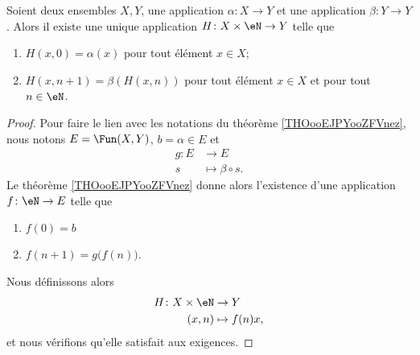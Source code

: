  
\begin{corollary}       \label{CORooVNHKooRkKtXf}
    Soient deux ensembles \( X,Y\), une application \( \alpha\colon X\to Y\) et une application \( \beta\colon Y\to Y\). Alors il existe une unique application \( H\colon X\times \eN\to Y\) telle que
\begin{enumerate}
    \item
  $H(x , 0) = \alpha(x)$   pour tout élément $x\in X$;
  \item
 $H(x , n+1 ) = \beta( H( x , n) )$ pour tout élément \( x\in X\) et pour tout \( n\in \eN\).
\end{enumerate}
\end{corollary}

\begin{proof}
    Pour faire le lien avec les notations du théorème \ref{THOooEJPYooZFVnez}, nous notons \( E=\Fun(X,Y)\), \( b=\alpha\in E\) et
    \begin{equation}
        \begin{aligned}
            g\colon E&\to E \\
            s&\mapsto \beta\circ s. 
        \end{aligned}
    \end{equation}
    Le théorème \ref{THOooEJPYooZFVnez} donne alors l'existence d'une application \( f\colon \eN\to E\) telle que
    \begin{enumerate}
        \item
            \( f(0)=b\)
        \item
            \( f(n+1)=g\big( f(n) \big)\).
    \end{enumerate}
    Nous définissons alors
    \begin{equation}
        \begin{aligned}
            H\colon X\times \eN&\to Y \\
            (x,n)&\mapsto f(n)x, 
        \end{aligned}
    \end{equation}
    et nous vérifions qu'elle satisfait aux exigences.


\end{proof}
